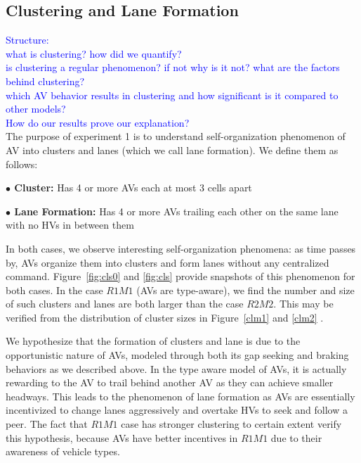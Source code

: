 \documentclass[oneside,letter,11pt]{article}
\begin{document}
\subsection{\textbf{Clustering and Lane Formation}}
\textcolor{blue}{Structure: \\ what is clustering? how did we quantify? \\is clustering a regular phenomenon? if not why is it not? what are the factors behind clustering? \\which AV behavior results in clustering and how significant is it compared to other models? \\How do our results prove our explanation?\\}
The purpose of experiment 1 is to understand self-organization phenomenon of AV into clusters and lanes (which we call lane formation). We define them as follows: 
\begin{deflist}
\hspace{-1cm}\textbf{$\bullet$ Cluster:} Has 4 or more AVs each at most 3 cells apart \\
\end{deflist}
\vspace{-0.5cm}
\begin{deflist}
\hspace{-1cm}\textbf{$\bullet$ Lane Formation:} Has 4 or more AVs trailing each other on the same lane with no HVs in between them
\end{deflist}

In both cases, we observe interesting self-organization phenomena: as time passes by, AVs organize them into clusters and form lanes without any centralized command. Figure~\ref{fig:cls0} and \ref{fig:cls} provide snapshots of this phenomenon for both cases. In the case $R1M1$ (AVs are type-aware), we find the number and size of such clusters and lanes are both larger than the case $R2M2$. This may be verified from the distribution of cluster sizes in Figure~\ref{clm1} and \ref{clm2} .

We hypothesize that the formation of clusters and lane is due to the opportunistic nature of AVs, modeled through both its gap seeking and braking behaviors as we described above. In the type aware model of AVs, it is actually rewarding to the AV to trail behind another AV as they can achieve smaller headways. This leads to the phenomenon of lane formation as AVs are essentially incentivized to change lanes aggressively and overtake HVs to seek and follow a peer. The fact that $R1M1$ case has stronger clustering to certain extent verify this hypothesis, because AVs have better incentives in $R1M1$ due to their awareness of vehicle types.
\end{document}
